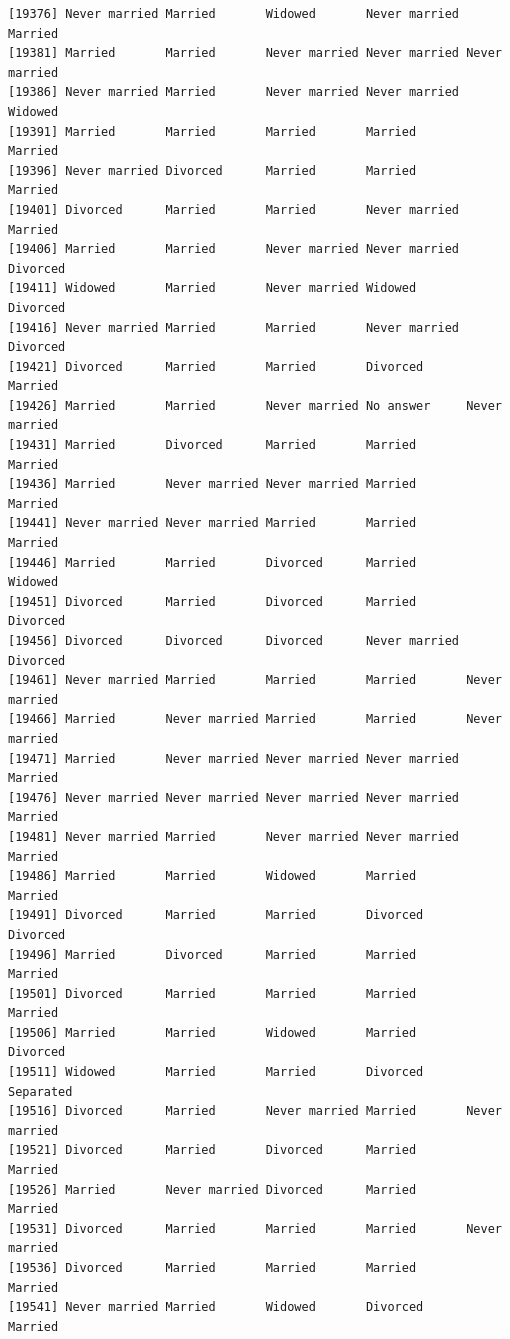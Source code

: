 \documentclass[
  letterpaper,
  DIV=11,
  numbers=noendperiod,
  oneside]{scrartcl}
\begin{document}
\begin{verbatim}
[19376] Never married Married       Widowed       Never married Married      
[19381] Married       Married       Never married Never married Never married
[19386] Never married Married       Never married Never married Widowed      
[19391] Married       Married       Married       Married       Married      
[19396] Never married Divorced      Married       Married       Married      
[19401] Divorced      Married       Married       Never married Married      
[19406] Married       Married       Never married Never married Divorced     
[19411] Widowed       Married       Never married Widowed       Divorced     
[19416] Never married Married       Married       Never married Divorced     
[19421] Divorced      Married       Married       Divorced      Married      
[19426] Married       Married       Never married No answer     Never married
[19431] Married       Divorced      Married       Married       Married      
[19436] Married       Never married Never married Married       Married      
[19441] Never married Never married Married       Married       Married      
[19446] Married       Married       Divorced      Married       Widowed      
[19451] Divorced      Married       Divorced      Married       Divorced     
[19456] Divorced      Divorced      Divorced      Never married Divorced     
[19461] Never married Married       Married       Married       Never married
[19466] Married       Never married Married       Married       Never married
[19471] Married       Never married Never married Never married Married      
[19476] Never married Never married Never married Never married Married      
[19481] Never married Married       Never married Never married Married      
[19486] Married       Married       Widowed       Married       Married      
[19491] Divorced      Married       Married       Divorced      Divorced     
[19496] Married       Divorced      Married       Married       Married      
[19501] Divorced      Married       Married       Married       Married      
[19506] Married       Married       Widowed       Married       Divorced     
[19511] Widowed       Married       Married       Divorced      Separated    
[19516] Divorced      Married       Never married Married       Never married
[19521] Divorced      Married       Divorced      Married       Married      
[19526] Married       Never married Divorced      Married       Married      
[19531] Divorced      Married       Married       Married       Never married
[19536] Divorced      Married       Married       Married       Married      
[19541] Never married Married       Widowed       Divorced      Married      

\end{verbatim}
\end{document}
